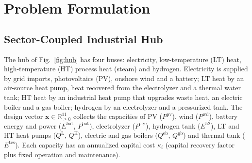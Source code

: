 \documentclass[journal]{IEEEtran}
\begin{document}
\section{Problem Formulation}\label{sec:problem}

\subsection{Sector-Coupled Industrial Hub}
The hub of Fig.~\ref{fig:hub} has four buses: electricity, low-temperature (LT) heat, high-temperature (HT) process heat (steam) and hydrogen. Electricity is supplied by grid imports, photovoltaics (PV), onshore wind and a battery; LT heat by an air-source heat pump, heat recovered from the electrolyzer and a thermal water tank; HT heat by an industrial heat pump that upgrades waste heat, an electric boiler and a gas boiler; hydrogen by an electrolyzer and a pressurized tank. The design vector $\bm{x}\in\mathbb{R}^{11}_{\ge 0}$ collects the capacities of PV ($P^{\mathrm{pv}}$), wind ($P^{\mathrm{wd}}$), battery energy and power ($E^{\mathrm{bat}}$, $P^{\mathrm{bat}}$), electrolyzer ($P^{\mathrm{ely}}$), hydrogen tank ($E^{\mathrm{h2}}$), LT and HT heat pumps ($Q^{\mathrm{L}}$, $Q^{\mathrm{H}}$), electric and gas boilers ($Q^{\mathrm{eb}}$, $Q^{\mathrm{gb}}$) and thermal tank ($E^{\mathrm{tes}}$). Each capacity has an annualized capital cost $\kappa_i$ (capital recovery factor plus fixed operation and maintenance).


\end{document}
